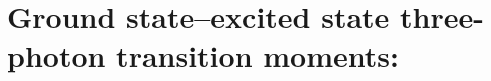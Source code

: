 
\section{Ground state--excited state three-photon 
transition moments: }\label{sec:cctm}

\begin{description}
\item[] 
\item[] 
\item[] 
\item[] 
\item[] 
%
\end{description}

